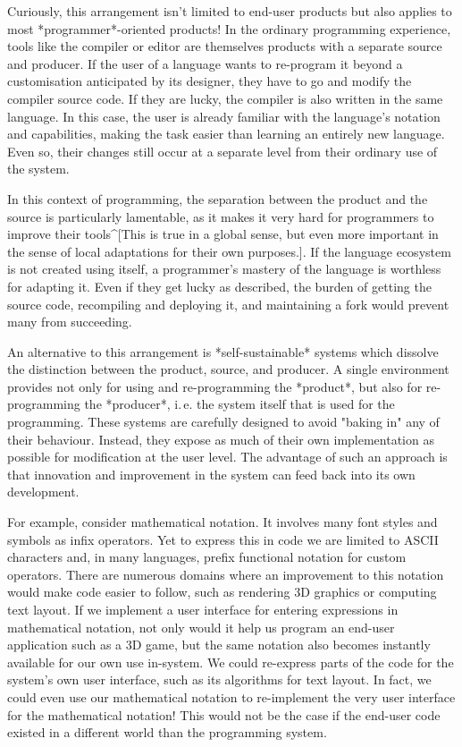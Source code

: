 \documentclass[ twoside,openright,titlepage,numbers=noenddot,headinclude,footinclude,cleardoublepage=empty,abstract=on,
                BCOR=5mm,paper=a4,fontsize=11pt
                ]{scrreprt}
\newcommand{\ie}{i.\,e.}
\theoremstyle{definition}
\begin{document}
{Curiously, this arrangement isn't limited to end-user products but also applies to most *programmer*-oriented products! In the ordinary programming experience, tools like the compiler or editor are themselves products with a separate source and producer. If the user of a language wants to re-program it beyond a customisation anticipated by its designer, they have to go and modify the compiler source code. If they are lucky, the compiler is also written in the same language. In this case, the user is already familiar with the language's notation and capabilities, making the task easier than learning an entirely new language. Even so, their changes still occur at a separate level from their ordinary use of the system.

In this context of programming, the separation between the product and the source is particularly lamentable, as it makes it very hard for programmers to improve their tools^[This is true in a global sense, but even more important in the sense of local adaptations for their own purposes.]. If the language ecosystem is not created using itself, a programmer's mastery of the language is worthless for adapting it. Even if they get lucky as described, the burden of getting the source code, recompiling and deploying it, and maintaining a fork would prevent many from succeeding.

An alternative to this arrangement is *self-sustainable* systems which dissolve the distinction between the product, source, and producer. A single environment provides not only for using and re-programming the *product*, but also for re-programming the *producer*, \ie{} the system itself that is used for the programming. These systems are carefully designed to avoid "baking in" any of their behaviour. Instead, they expose as much of their own implementation as possible for modification at the user level. The advantage of such an approach is that innovation and improvement in the system can feed back into its own development.

For example, consider mathematical notation. It involves many font styles and symbols as infix operators. Yet to express this in code we are limited to ASCII characters and, in many languages, prefix functional notation for custom operators. There are numerous domains where an improvement to this notation would make code easier to follow, such as rendering 3D graphics or computing text layout. If we implement a user interface for entering expressions in mathematical notation, not only would it help us program an end-user application such as a 3D game, but the same notation also becomes instantly available for our own use in-system. We could re-express parts of the code for the system's own user interface, such as its algorithms for text layout. In fact, we could even use our mathematical notation to re-implement the very user interface for the mathematical notation! This would not be the case if the end-user code existed in a different world than the programming system.

}
\end{document}
